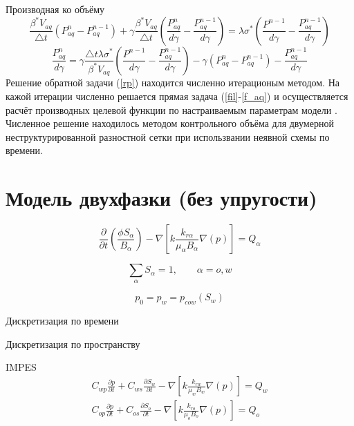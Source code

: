 \documentclass[14pt]{article}
\begin{document}
Производная ко объёму
\begin{equation} \label{rp}
\frac{\beta^* V_{aq}}{\bigtriangleup t} (P_{aq}^n - P_{aq}^{n-1}) + \gamma\frac{\beta^* V_{aq}}{\bigtriangleup t} \left(\frac{P_{aq}^n}{d\gamma}  -\frac{P_{aq}^{n-1}}{d\gamma}\right) = \lambda\sigma^*(\frac{P^{n-1}}{d\gamma}-\frac{P_{aq}^{n-1}}{d\gamma})
\end{equation}
\begin{equation} \label{rp}
\frac{P_{aq}^n}{d\gamma} = \gamma\frac{\bigtriangleup t \lambda\sigma^*}{\beta^* V_{aq}} \left( \frac{P^{n-1}}{d\gamma}-\frac{P_{aq}^{n-1}}{d\gamma}\right) - \gamma (P_{aq}^n - P_{aq}^{n-1}) -\frac{P_{aq}^{n-1}}{d\gamma}
\end{equation}
Решение обратной задачи (\ref{rp}) находится численно итерационым методом. На кажой итерации численно решается прямая задача (\ref{fil}-\ref{f_aq}) и осуществляется расчёт производных целевой функции по настраиваемым параметрам модели \cite{opt}. Численное решение находилось методом контрольного объёма  для двумерной неструктурированной разностной сетки при использвании неявной схемы по времени.


\section{Модель двухфазки (без упругости)}

	\begin{equation}
		\frac{\partial}{\partial t} \left( \frac{\phi S_{\alpha}}{B_{\alpha}} \right) - \nabla \left[ k \frac{k_{r \alpha}}{\mu_{\alpha} B_{\alpha}} \nabla \left( p \right) \right] = Q_{\alpha}
	\end{equation}
	
	\begin{equation}
		\sum_{\alpha} S_{\alpha} = 1, \qquad \alpha = o,w
	\end{equation}
	
	\begin{equation}
		p_{0} = p_{w} = p_{cow}(S_{w})
	\end{equation}
	
	Дискретизация по времени
	
	
	Дискретизация по пространству
	
	
	IMPES
	\begin{eqnarray}
		C_{wp} \frac{\partial p}{\partial t} +
		C_{ws} \frac{\partial S_{w}}{\partial t} -
		\nabla \left[ k \frac{k_{rw}}{\mu_{w} B_{w}} \nabla \left( p \right) \right] = Q_{w} \\
		C_{op} \frac{\partial p}{\partial t} +
		C_{os} \frac{\partial S_{o}}{\partial t} -
		\nabla \left[ k \frac{k_{ro}}{\mu_{o} B_{o}} \nabla \left( p \right) \right] = Q_{o}	
	\end{eqnarray}
	
\end{document}
